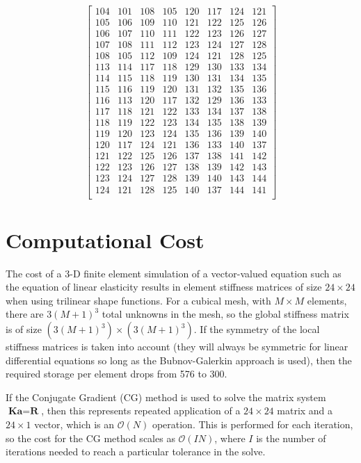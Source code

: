 \documentclass[10pt]{article}
\begin{document}
\begin{equation}
\begin{bmatrix}
104 & 101 & 108 & 105 & 120 & 117 & 124 & 121\\
105 & 106 & 109 & 110 & 121 & 122 & 125 & 126\\
106 & 107 & 110 & 111 & 122 & 123 & 126 & 127\\
107 & 108 & 111 & 112 & 123 & 124 & 127 & 128\\
108 & 105 & 112 & 109 & 124 & 121 & 128 & 125\\
113 & 114 & 117 & 118 & 129 & 130 & 133 & 134\\
114 & 115 & 118 & 119 & 130 & 131 & 134 & 135\\
115 & 116 & 119 & 120 & 131 & 132 & 135 & 136\\
116 & 113 & 120 & 117 & 132 & 129 & 136 & 133\\
117 & 118 & 121 & 122 & 133 & 134 & 137 & 138\\
118 & 119 & 122 & 123 & 134 & 135 & 138 & 139\\
119 & 120 & 123 & 124 & 135 & 136 & 139 & 140\\
120 & 117 & 124 & 121 & 136 & 133 & 140 & 137\\
121 & 122 & 125 & 126 & 137 & 138 & 141 & 142\\
122 & 123 & 126 & 127 & 138 & 139 & 142 & 143\\
123 & 124 & 127 & 128 & 139 & 140 & 143 & 144\\
124 & 121 & 128 & 125 & 140 & 137 & 144 & 141\\
\end{bmatrix}
\end{equation}

\section{Computational Cost}

The cost of a 3-D finite element simulation of a vector-valued equation such as the equation of linear elasticity results in element stiffness matrices of size \(24\times24\) when using trilinear shape functions. For a cubical mesh, with \(M\times M\) elements, there are \(3(M+1)^3\) total unknowns in the mesh, so the global stiffness matrix is of size \((3(M+1)^3)\times(3(M+1)^3)\). If the symmetry of the local stiffness matrices is taken into account (they will always be symmetric for linear differential equations so long as the Bubnov-Galerkin approach is used), then the required storage per element drops from 576 to 300. 

If the Conjugate Gradient (CG) method is used to solve the matrix system \(\textbf{K}\textbf{a}=\textbf{R}\), then this represents repeated application of a \(24\times24\) matrix and a \(24\times1\) vector, which is an \(\mathscr{O}(N)\) operation. This is performed for each iteration, so the cost for the CG method scales as \(\mathscr{O}(IN)\), where \(I\) is the number of iterations needed to reach a particular tolerance in the solve.
\end{document}
